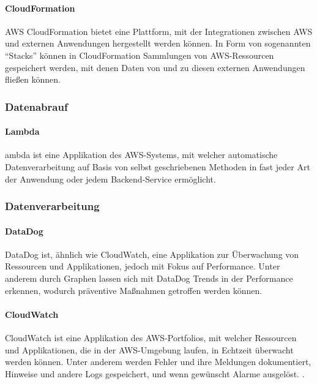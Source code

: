 \paragraph{CloudFormation}
AWS CloudFormation bietet eine Plattform, mit der Integrationen zwischen AWS und externen Anwendungen hergestellt werden können. In Form von sogenannten ``Stacks'' können in CloudFormation Sammlungen von AWS-Ressourcen gespeichert werden, mit denen Daten von und zu diesen externen Anwendungen fließen können.
\subsubsection{Datenabrauf}
\paragraph{Lambda}
 ambda ist eine Applikation des AWS-Systems, mit welcher automatische Datenverarbeitung auf Basis von selbst geschriebenen Methoden in fast jeder Art der Anwendung oder jedem Backend-Service ermöglicht. \cite{AWS2024d} 
 
 \subsubsection{Datenverarbeitung}
\paragraph{DataDog} 
DataDog ist, ähnlich wie CloudWatch, eine Applikation zur Überwachung von Ressourcen und Applikationen, jedoch mit Fokus auf Performance. Unter anderem durch Graphen lassen sich mit DataDog Trends in der Performance erkennen, wodurch präventive Maßnahmen getroffen werden können. \cite{Dixon2018} 
\paragraph{CloudWatch} 
CloudWatch ist eine Applikation des AWS-Portfolios, mit welcher Ressourcen und Applikationen, die in der AWS-Umgebung laufen, in Echtzeit überwacht werden können. Unter anderem werden Fehler und ihre Meldungen dokumentiert, Hinweise und andere Logs gespeichert, und wenn gewünscht Alarme ausgelöst. \cite{AWS2024a} \cite{AWS2024b} . \cite{AWS2024c}
